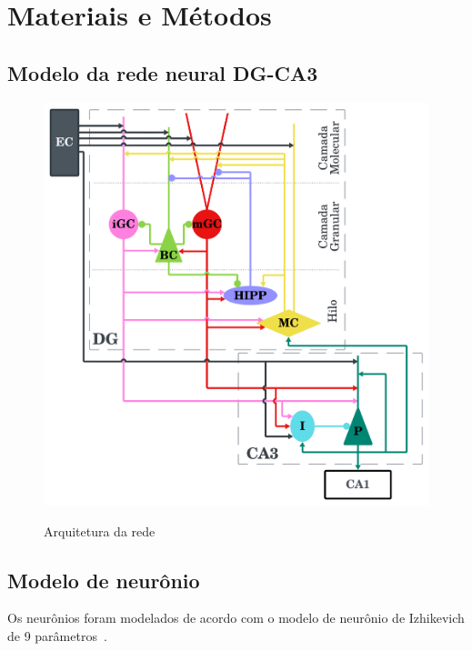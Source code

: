 \chapter{Materiais e Métodos}

\section{Modelo da rede neural DG-CA3}




\begin{figure}
    \centering
    \caption{Arquitetura da rede}
    \includegraphics[scale=0.7]{figuras/arquitetura-rede.png}
    \label{fig:arquitetura-rede}
\end{figure}


\section{Modelo de neurônio}

Os neurônios foram modelados de acordo com o modelo de neurônio de Izhikevich de 9 parâmetros~\cite[cap.~8]{izhikevichDynamical2006}.








